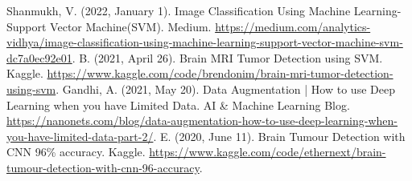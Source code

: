 \documentclass[conference]{IEEEtran}
\begin{document}
\begin{thebibliography}{00}
 Shanmukh, V. (2022, January 1). Image Classification Using Machine Learning-Support Vector Machine(SVM). Medium. \url{https://medium.com/analytics-vidhya/image-classification-using-machine-learning-support-vector-machine-svm-dc7a0ec92e01}.
 B. (2021, April 26). Brain MRI Tumor Detection using SVM. Kaggle. \url{https://www.kaggle.com/code/brendonim/brain-mri-tumor-detection-using-svm}.
 Gandhi, A. (2021, May 20). Data Augmentation | How to use Deep Learning when you have Limited Data. AI & Machine Learning Blog. \url{https://nanonets.com/blog/data-augmentation-how-to-use-deep-learning-when-you-have-limited-data-part-2/}.
 E. (2020, June 11). Brain Tumour Detection with CNN 96\% accuracy. Kaggle. \url{https://www.kaggle.com/code/ethernext/brain-tumour-detection-with-cnn-96-accuracy}.
\end{thebibliography}
\end{document}
